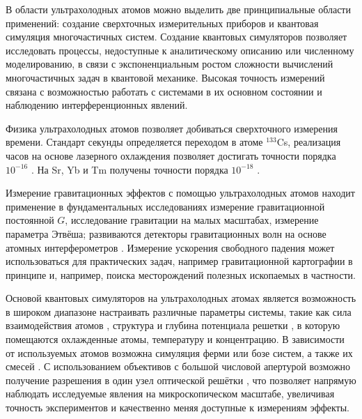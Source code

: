 В области ультрахолодных атомов можно выделить две принципиальные области применений: создание сверхточных измерительных приборов и квантовая симуляция многочастичных систем. Создание квантовых симуляторов позволяет исследовать процессы, недоступные к аналитическому описанию или численному моделированию, в связи с экспоненциальным ростом сложности вычислений многочастичных задач в квантовой механике. Высокая точность измерений связана с возможностью работать с системами в их основном состоянии и наблюдению интерференционных явлений.





Физика ультрахолодных атомов позволяет добиваться сверхточного измерения времени. Стандарт секунды определяется переходом в атоме ${}^{133}$Cs, реализация часов на основе лазерного охлаждения позволяет достигать точности порядка $10^{-16}$ \cite{schmittberger2020review, 799241}. На Sr, Yb и Tm получены точности порядка $10^{-18}$ \cite{schmittberger2020review, Bloom_2014,Golovizin2019}. 

Измерение гравитационных эффектов с помощью ультрахолодных атомов находит применение в фундаментальных исследованиях \cite{Tino_2021} измерение гравитационной постоянной $G$, исследование гравитации на малых масштабах, измерение параметра Этвёша; развиваются детекторы гравитационных волн на основе атомных интерферометров \cite{Dimopoulos_2009}. Измерение ускорения свободного падения может использоваться для практических задач, например гравитационной картографии в принципе \cite{QuantumSensing} и, например, поиска месторождений полезных ископаемых \cite{Tino_2021} в частности.




Основой квантовых симуляторов на ультрахолодных атомах является возможность в широком диапазоне настраивать различные параметры системы, такие как сила взаимодействия атомов \cite{bloch2012quantum}
, структура и глубина потенциала решетки \cite{lewenstein_ultracold_2007, gross_quantum_2017, tsyganok2023boseeinstein}, в которую помещаются охлажденные атомы, температуру и концентрацию. В зависимости от используемых атомов возможна симуляция ферми или бозе систем, а также их смесей \cite{yamamoto2012lattice}. С использованием объективов с большой числовой апертурой возможно получение разрешения в один узел оптической решётки \cite{Sherson_2010}, что позволяет напрямую наблюдать исследуемые явления на микроскопическом масштабе, увеличивая точность экспериментов и качественно меняя доступные к измерениям эффекты.  

